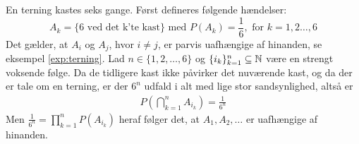 \begin{exmp}\label{exmp:uafhængelighed}
En terning kastes seks gange. Først defineres følgende hændelser: \begin{equation*} 
    A_k=\{6 \text{ ved det k'te kast}\} \text{ med } P(A_k)=\frac{1}{6}, \text{ for } k = 1,2\ldots,6 
\end{equation*} 
Det gælder, at $A_i$ og $A_j$, hvor  $i\neq j$, er parvis uafhængige af hinanden, se eksempel \ref{exp:terning}. Lad $n \in \{1, 2, \ldots, 6\}$ og $\{i_k\}_{k = 1}^n\subseteq \mathbb{N}$ være en strengt voksende følge.
Da de tidligere kast ikke påvirker det nuværende kast, og da der er tale om en terning, er der $6^n$ udfald i alt med lige stor sandsynlighed, altså er
\begin{align*}
    P\left(\bigcap_{k=1}^n A_{i_k}\right)=\frac{1}{6^n}
\end{align*}
 Men $\frac{1}{6^n} = \prod_{k=1}^n P\left(A_{i_k}\right)$ heraf følger det, at $A_1, A_2, \ldots$ er uafhængige af hinanden.
\end{exmp}
